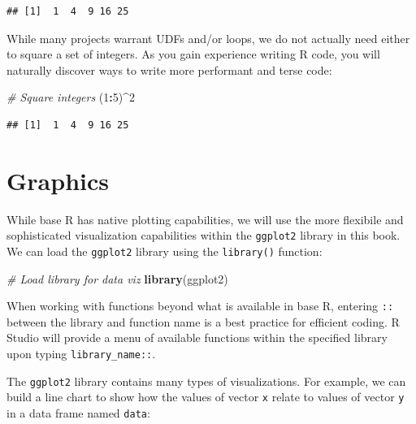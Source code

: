 \documentclass[]{book}
\newenvironment{Shaded}{\begin{snugshade}}{\end{snugshade}}
\newcommand{\CommentTok}[1]{\textcolor[rgb]{0.56,0.35,0.01}{\textit{#1}}}
\newcommand{\DecValTok}[1]{\textcolor[rgb]{0.00,0.00,0.81}{#1}}
\newcommand{\KeywordTok}[1]{\textcolor[rgb]{0.13,0.29,0.53}{\textbf{#1}}}
\newcommand{\NormalTok}[1]{#1}
\newcommand{\OperatorTok}[1]{\textcolor[rgb]{0.81,0.36,0.00}{\textbf{#1}}}
\begin{document}
\begin{verbatim}
## [1]  1  4  9 16 25
\end{verbatim}

While many projects warrant UDFs and/or loops, we do not actually need either to square a set of integers. As you gain experience writing R code, you will naturally discover ways to write more performant and terse code:

\begin{Shaded}
\begin{Highlighting}[]
\CommentTok{# Square integers}
\NormalTok{(}\DecValTok{1}\OperatorTok{:}\DecValTok{5}\NormalTok{)}\OperatorTok{^}\DecValTok{2}
\end{Highlighting}
\end{Shaded}

\begin{verbatim}
## [1]  1  4  9 16 25
\end{verbatim}

\hypertarget{graphics}{%
\section{Graphics}\label{graphics}}

While base R has native plotting capabilities, we will use the more flexibile and sophisticated visualization capabilities within the \texttt{ggplot2} library in this book. We can load the \texttt{ggplot2} library using the \texttt{library()} function:

\begin{Shaded}
\begin{Highlighting}[]
\CommentTok{# Load library for data viz}
\KeywordTok{library}\NormalTok{(ggplot2)}
\end{Highlighting}
\end{Shaded}

When working with functions beyond what is available in base R, entering \texttt{::} between the library and function name is a best practice for efficient coding. R Studio will provide a menu of available functions within the specified library upon typing \texttt{library\_name::}.

The \texttt{ggplot2} library contains many types of visualizations. For example, we can build a line chart to show how the values of vector \texttt{x} relate to values of vector \texttt{y} in a data frame named \texttt{data}:
\end{document}
